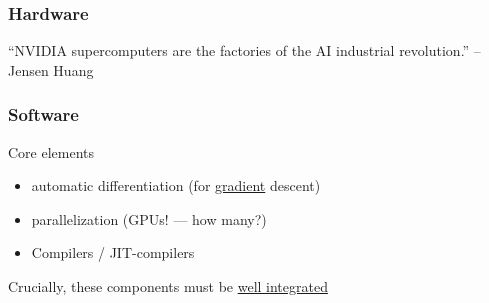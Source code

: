 \documentclass[
    xcolor={svgnames,dvipsnames},
    hyperref={colorlinks, citecolor=DeepPink4, linkcolor=DarkRed, urlcolor=DarkBlue}
    ]{beamer}  %
\newcommand{\1}{\mathbbm 1}
\begin{document}
\begin{frame}
    \frametitle{Hardware}
    
    \begin{figure}
       \begin{center}
       \end{center}
    \end{figure}


\end{frame}


\begin{frame} 
    
    ``NVIDIA supercomputers are the factories of the AI industrial
    revolution.'' -- Jensen Huang

\end{frame}




\begin{frame}
    \frametitle{Software}
    
    Core elements
    \begin{itemize}
        \item automatic differentiation (for \underline{gradient} descent)
        \vspace{0.5em}
        \item parallelization (GPUs! --- how many?)
        \vspace{0.5em}
        \item Compilers / JIT-compilers
    \end{itemize}

        \vspace{0.5em}
        \vspace{0.5em}
    Crucially, these components must be \underline{well integrated}


\end{frame}
\end{document}
